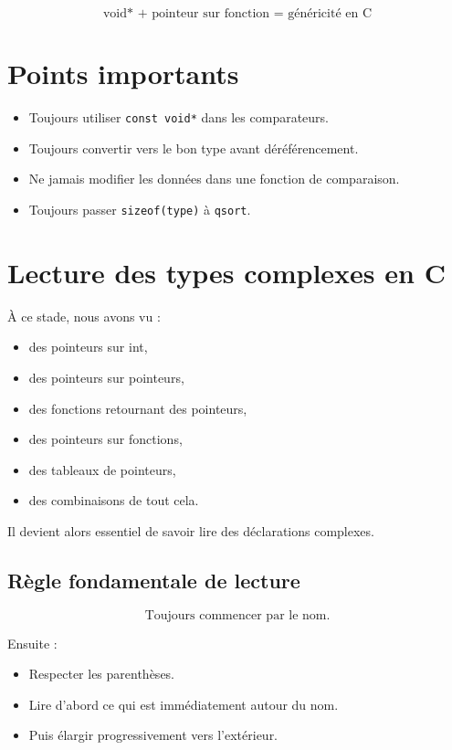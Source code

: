 \[
\boxed{
\text{void* + pointeur sur fonction = généricité en C}
}
\]

\section{Points importants}

\begin{itemize}
\item Toujours utiliser \texttt{const void*} dans les comparateurs.
\item Toujours convertir vers le bon type avant déréférencement.
\item Ne jamais modifier les données dans une fonction de comparaison.
\item Toujours passer \texttt{sizeof(type)} à \texttt{qsort}.
\end{itemize}

\section{Lecture des types complexes en C}

À ce stade, nous avons vu :

\begin{itemize}
\item des pointeurs sur int,
\item des pointeurs sur pointeurs,
\item des fonctions retournant des pointeurs,
\item des pointeurs sur fonctions,
\item des tableaux de pointeurs,
\item des combinaisons de tout cela.
\end{itemize}

Il devient alors essentiel de savoir lire des déclarations complexes.

\subsection{Règle fondamentale de lecture}

\[
\boxed{\text{Toujours commencer par le nom.}}
\]

Ensuite :

\begin{itemize}
\item Respecter les parenthèses.
\item Lire d’abord ce qui est immédiatement autour du nom.
\item Puis élargir progressivement vers l’extérieur.
\end{itemize}

